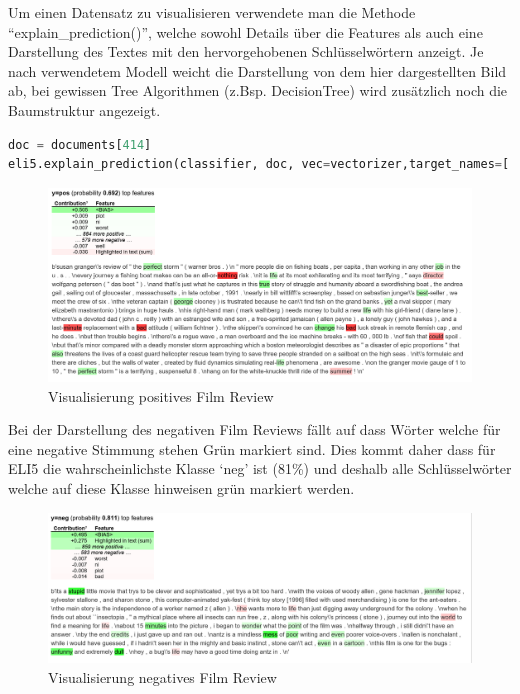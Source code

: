 \documentclass[
  12pt, %
  a4paper, %
  oneside, %
  openany, 
  numbers=noenddot, %
  BCOR=5mm, %
  parskip=half*, %
  thesis, %
]{bfhbook}
\begin{document}
Um einen Datensatz zu visualisieren verwendete man die Methode ``explain\_prediction()'', welche sowohl Details über die Features als auch eine Darstellung des Textes mit den hervorgehobenen Schlüsselwörtern anzeigt. Je nach verwendetem Modell weicht die Darstellung von dem hier dargestellten Bild ab, bei gewissen Tree Algorithmen (z.Bsp. DecisionTree) wird zusätzlich noch die Baumstruktur angezeigt.
\begin{lstlisting}[language=Python]
doc = documents[414]
eli5.explain_prediction(classifier, doc, vec=vectorizer,target_names=['neg','pos'], top=20)
\end{lstlisting}
\begin{figure}[ht]
\centering
\includegraphics[width=\textwidth]{Bilder/MovieReviews-SentimentClassification_1.PNG}
\caption{Visualisierung positives Film Review}
\end{figure}

Bei der Darstellung des negativen Film Reviews fällt auf dass Wörter welche für eine negative Stimmung stehen Grün markiert sind. Dies kommt daher dass für ELI5 die wahrscheinlichste Klasse `neg' ist (81\%) und deshalb alle Schlüsselwörter welche auf diese Klasse hinweisen grün markiert werden.
\begin{figure}[ht]
\centering
\includegraphics[width=\textwidth]{Bilder/MovieReviews-SentimentClassification_2.PNG}
\caption{Visualisierung negatives Film Review}
\end{figure}
\end{document}
